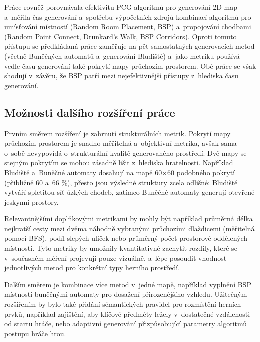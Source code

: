 \documentclass[
   program=itk,
   biblatex,
   figures=true,
   tables=true,
   glossaries,
   index
]{kidiplom}
\begin{document}
Práce \cite{Monaghan2019} rovněž porovnávala efektivitu PCG algoritmů pro generování 2D map a~měřila čas generování a~spotřebu výpočetních zdrojů kombinací algoritmů pro umísťování místností (Random Room Placement, BSP) a~propojování chodbami (Random Point Connect, Drunkard's Walk, BSP Corridors). Oproti tomuto přístupu se předkládaná práce zaměřuje na pět samostatných generovacích metod (včetně Buněčných automatů a~generování Bludiště) a~jako metriku používá vedle času generování také pokrytí mapy průchozím prostorem. Obě práce se však shodují v~závěru, že BSP patří mezi nejefektivnější přístupy z~hlediska času generování.

\subsection{Možnosti dalšího rozšíření práce}
Prvním směrem rozšíření je zahrnutí strukturálních metrik. Pokrytí mapy průchozím prostorem je snadno měřitelná a~objektivní metrika, avšak sama o~sobě nevypovídá o~strukturální kvalitě generovaného prostředí. Dvě mapy se stejným pokrytím se mohou zásadně lišit z~hlediska hratelnosti. Například Bludiště a~Buněčné automaty dosahují na mapě 60$\times$60 podobného pokrytí (přibližně 60 a~66 \%), přesto jsou výsledné struktury zcela odlišné: Bludiště vytváří spletitou síť úzkých chodeb, zatímco Buněčné automaty generují otevřené jeskynní prostory.

Relevantnějšími doplňkovými metrikami by mohly být například průměrná délka nejkratší cesty mezi dvěma náhodně vybranými průchozími dlaždicemi (měřitelná pomocí BFS), podíl slepých uliček nebo průměrný počet prostorově oddělených místností. Tyto metriky by umožnily kvantitativně zachytit rozdíly, které se v~současném měření projevují pouze vizuálně, a~lépe posoudit vhodnost jednotlivých metod pro konkrétní typy herního prostředí.

Dalším směrem je kombinace více metod v~jedné mapě, například vyplnění BSP místností buněčnými automaty pro dosažení přirozenějšího vzhledu.
Užitečným rozšířením by bylo také přidání sémantických pravidel pro rozmístění herních prvků, například zajištění, aby klíčové předměty ležely v~dostatečné vzdálenosti od startu hráče, nebo adaptivní generování přizpůsobující parametry algoritmů postupu hráče hrou.
\end{document}
